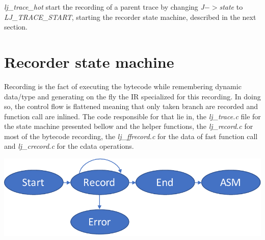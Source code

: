 \emph{lj\_trace\_hot} start the recording of a parent trace by changing
\emph{J$->$state} to \emph{LJ\_TRACE\_START}, starting the recorder state
machine, described in the next section.



\section{Recorder state machine}
\label{Sec:recorder-state-machine}

Recording is the fact of executing the bytecode while remembering dynamic
data/type and generating on the fly the IR specialized for this recording. In
doing so, the control flow is flattened meaning that only taken branch are
recorded and function call are inlined. The code responsible for that lie in, the
\emph{lj\_trace.c} file for the state machine presented bellow and the helper
functions, the \emph{lj\_record.c} for most of the bytecode recording,
the \emph{lj\_ffrecord.c} for the data of fast function call and
\emph{lj\_crecord.c} for the cdata operations.

\includegraphics[width=\textwidth]{./Images/FSM.pdf}

